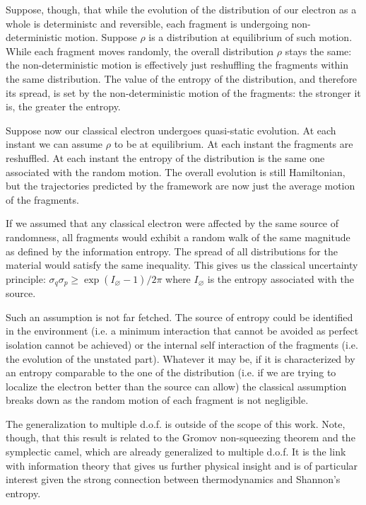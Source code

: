 \documentclass[smallextended]{svjour3}
\numberwithin{equation}{section}
\theoremstyle{definition}
\begin{document}
Suppose, though, that while the evolution of the distribution of our electron as a whole is deterministc and reversible, each fragment is undergoing non-deterministic motion. Suppose $\rho$ is a distribution at equilibrium of such motion. While each fragment moves randomly, the overall distribution $\rho$ stays the same: the non-deterministic motion is effectively just reshuffling the fragments within the same distribution. The value of the entropy of the distribution, and therefore its spread, is set by the non-deterministic motion of the fragments: the stronger it is, the greater the entropy.

Suppose now our classical electron undergoes quasi-static evolution. At each instant we can assume $\rho$ to be at equilibrium. At each instant the fragments are reshuffled. At each instant the entropy of the distribution is the same one associated with the random motion. The overall evolution is still Hamiltonian, but the trajectories predicted by the framework are now just the average motion of the fragments. 

If we assumed that any classical electron were affected by the same source of randomness, all fragments would exhibit a random walk of the same magnitude as defined by the information entropy. The spread of all distributions for the material would satisfy the same inequality. This gives us the classical uncertainty principle: $\sigma_q\sigma_p \geq \exp (I_\varnothing - 1) / 2 \pi $ where $I_\varnothing$ is the entropy associated with the source.

Such an assumption is not far fetched. The source of entropy could be identified in the environment (i.e. a minimum interaction that cannot be avoided as perfect isolation cannot be achieved) or the internal self interaction of the fragments (i.e. the evolution of the unstated part). Whatever it may be, if it is characterized by an entropy comparable to the one of the distribution (i.e. if we are trying to localize the electron better than the source can allow) the classical assumption breaks down as the random motion of each fragment is not negligible.

The generalization to multiple d.o.f. is outside of the scope of this work. Note, though, that this result is related to the Gromov non-squeezing theorem and the symplectic camel, which are already generalized to multiple d.o.f. It is the link with information theory that gives us further physical insight and is of particular interest given the strong connection between thermodynamics and Shannon's entropy.
\end{document}
